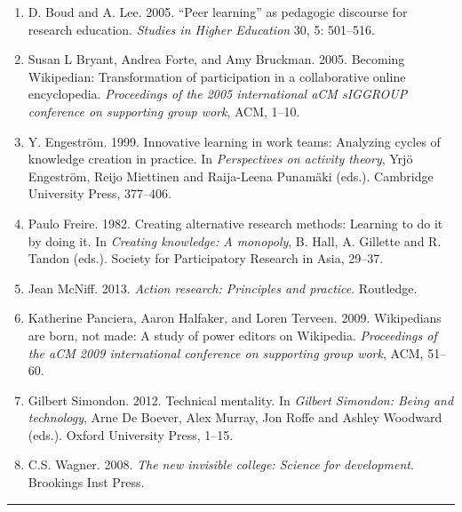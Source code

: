 \begin{enumerate}
\def\labelenumi{\arabic{enumi}.}
\item
  D. Boud and A. Lee. 2005. ``Peer learning'' as pedagogic discourse for
  research education. \emph{Studies in Higher Education} 30, 5:
  501--516.
\item
  Susan L Bryant, Andrea Forte, and Amy Bruckman. 2005. Becoming
  Wikipedian: Transformation of participation in a collaborative online
  encyclopedia. \emph{Proceedings of the 2005 international aCM sIGGROUP
  conference on supporting group work}, ACM, 1--10.
\item
  Y. Engeström. 1999. Innovative learning in work teams: Analyzing
  cycles of knowledge creation in practice. In \emph{Perspectives on
  activity theory}, Yrjö Engeström, Reijo Miettinen and Raija-Leena
  Punamäki (eds.). Cambridge University Press, 377--406.
\item
  Paulo Freire. 1982. Creating alternative research methods: Learning to
  do it by doing it. In \emph{Creating knowledge: A monopoly}, B. Hall,
  A. Gillette and R. Tandon (eds.). Society for Participatory Research
  in Asia, 29--37.
\item
  Jean McNiff. 2013. \emph{Action research: Principles and practice}.
  Routledge.
\item
  Katherine Panciera, Aaron Halfaker, and Loren Terveen. 2009.
  Wikipedians are born, not made: A study of power editors on Wikipedia.
  \emph{Proceedings of the aCM 2009 international conference on
  supporting group work}, ACM, 51--60.
\item
  Gilbert Simondon. 2012. Technical mentality. In \emph{Gilbert
  Simondon: Being and technology}, Arne De Boever, Alex Murray, Jon
  Roffe and Ashley Woodward (eds.). Oxford University Press, 1--15.
\item
  C.S. Wagner. 2008. \emph{The new invisible college: Science for
  development}. Brookings Inst Press.
\end{enumerate}

\begin{center}\rule{0.5\linewidth}{0.5pt}\end{center}
